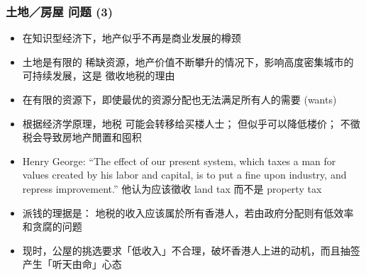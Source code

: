 \documentclass[16pt]{beamer}
\newcommand{\emp}[1]{{\color{blue}#1}}
\begin{document}
\begin{frame}
\frametitle{土地／房屋 问题 (3)}
\begin{itemize}
	\item 在知识型经济下，地产似乎不再是商业发展的樽颈
	
	\item 土地是有限的 \emp{稀缺资源}，地产价值不断攀升的情况下，影响高度密集城市的 可持续发展，这是 徵收地税的理由
	
	\nocite{Ryan-Collins2017}
	\nocite{Farvacque-Vitkoviac1992}
	\nocite{Blomley2004}
	\nocite{Linklater2013}
	\nocite{Adams2015}
	\nocite{简德三2012}
	\nocite{Poon2011}
	\nocite{潘慧娴2010}
	\nocite{OSullivan2012}
	\nocite{Rithmire2015}
	\nocite{Squires2013}
	\nocite{Harvey1996}
	\nocite{Girling1997}
	\nocite{Balia2009}
	\nocite{Peteri2003}
	\nocite{陈云2011}

	\item 在有限的资源下，即使最优的资源分配也无法满足所有人的需要 (wants)

	\item 根据经济学原理，地税 可能会转移给买楼人士； 但似乎可以降低楼价； 不徵税会导致房地产閒置和囤积
	
	\item Henry George: ``The effect of our present system, which taxes a man for values created by his labor and capital, is to put a fine upon industry, and repress improvement.'' 他认为应该徵收 land tax 而不是 property tax

	\item 派钱的理据是： 地税的收入应该属於所有香港人，若由政府分配则有低效率和贪腐的问题
	
	\item 现时，公屋的挑选要求「低收入」不合理，破坏香港人上进的动机，而且抽签 产生「听天由命」心态




\end{itemize}
\end{frame}
\end{document}
